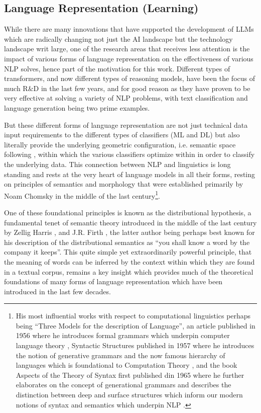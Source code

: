 \documentclass[final]{clv2025}
\begin{document}
\subsection{Language Representation (Learning)}
While there are many innovations that have supported the development of LLMs which are radically changing not just the AI landscape but the technology landscape writ large, one of the research areas that receives less attention is the impact of various forms of language representation on the effectiveness of various NLP solves, hence part of the motivation for this work. Different types of transformers, and now different types of reasoning models, have been the focus of much R\&D in the last few years, and for good reason as they have proven to be very effective at solving a variety of NLP problems, with text classification and language generation being two prime examples. 

But these different forms of language representation are not just technical data input requirements to the different types of classifiers (ML and DL) but also literally provide the underlying geometric configuration, i.e. semantic space following \cite{worth}, within which the various classifiers optimize within in order to classify the underlying data. This connection between NLP and linguistics is long standing and rests at the very heart of language models in all their forms, resting on principles of semantics and morphology that were established primarily by Noam Chomsky in the middle of the last century\footnote{  His most influential works with respect to computational linguistics perhaps being “Three Models for the description of Language”, an article published in 1956 where he introduces formal grammars which underpin computer language theory \cite{chomsky56}, Syntactic Structures published in 1957 where he introduces the notion of generative grammars and the now famous hierarchy of languages which is foundational to Computation Theory \cite{Chomsky57}, and the book Aspects of the Theory of Syntax first published din 1965 where he further elaborates on the concept of generational grammars and describes the distinction between deep and surface structures which inform our modern notions of syntax and semantics which underpin NLP \cite{chomsky65aspects}.}. 

One of these foundational principles is known as the distributional hypothesis, a fundamental tenet of semantic theory introduced in the middle of the last century by Zellig Harris \cite{harris}, and J.R. Firth \cite{firth}, the latter author being perhaps best known for his description of the distributional semantics as “you shall know a word by the company it keeps”. This quite simple yet extraordinarily powerful principle, that the meaning of words can be inferred by the context within which they are found in a textual corpus, remains a key insight which provides much of the theoretical foundations of many forms of language representation which have been introduced in the last few decades.
\end{document}

